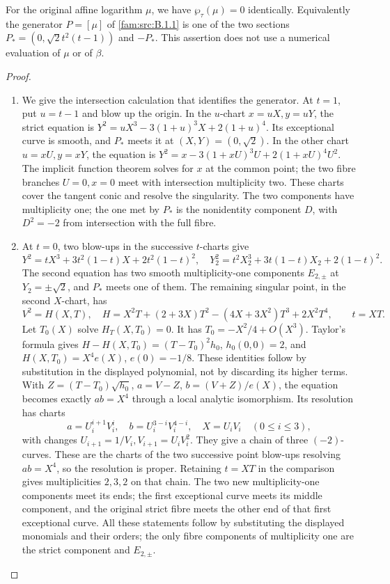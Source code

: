 \begin{proposition}\hypertarget{tag-01Q9}{}\label{fam:src:B.1.3}\label{fam:st:B.1.3}

For the original affine logarithm $\mu$, we have $\wp_\tau(\mu)=0$ identically. Equivalently the generator $P=[\mu]$ of \ref{fam:src:B.1.1} is one of the two sections $P_*=(0,\sqrt2t^2(t-1))$ and $-P_*$. This assertion does not use a numerical evaluation of $\mu$ or of $\beta$.
\end{proposition}


\begin{proof}
\begin{enumerate}[label=\arabic*.,leftmargin=*]
\item We give the intersection calculation that identifies the generator. At $t=1$, put $u=t-1$ and blow up the origin. In the $u$-chart $x=uX,y=uY$, the strict equation is
$Y^2=uX^3-3(1+u)^3X+2(1+u)^4$. Its exceptional curve is smooth, and $P_*$ meets it at $(X,Y)=(0,\sqrt2)$. In the other chart $u=xU,y=xY$, the equation is $Y^2=x-3(1+xU)^3U+2(1+xU)^4U^2$. The implicit function theorem solves for $x$ at the common point; the two fibre branches $U=0,x=0$ meet with intersection multiplicity two. These charts cover the tangent conic and resolve the singularity. The two components have multiplicity one; the one met by $P_*$ is the nonidentity component $D$, with $D^2=-2$ from intersection with the full fibre.

\item At $t=0$, two blow-ups in the successive $t$-charts give
\[
 Y^2=tX^3+3t^2(1-t)X+2t^2(1-t)^2,
\quad
 Y_2^2=t^2X_2^3+3t(1-t)X_2+2(1-t)^2.
\]
The second equation has two smooth multiplicity-one components $E_{2,\pm}$ at $Y_2=\pm\sqrt2$, and $P_*$ meets one of them. The remaining singular point, in the second $X$-chart, has
\[
 V^2=H(X,T),\quad H=X^2T+(2+3X)T^2-(4X+3X^2)T^3+2X^2T^4,
 \qquad t=XT.
\]
Let $T_0(X)$ solve $H_T(X,T_0)=0$. It has $T_0=-X^2/4+O(X^3)$. Taylor's formula gives
$H-H(X,T_0)=(T-T_0)^2h_0$, $h_0(0,0)=2$, and $H(X,T_0)=X^4e(X)$, $e(0)=-1/8$. These identities follow by substitution in the displayed polynomial, not by discarding its higher terms. With $Z=(T-T_0)\sqrt{h_0}$, $a=V-Z$, $b=(V+Z)/e(X)$, the equation becomes exactly $ab=X^4$ through a local analytic isomorphism. Its resolution has charts
\[
 a=U_i^{i+1}V_i^i,\quad b=U_i^{3-i}V_i^{4-i},\quad X=U_iV_i
 \quad(0\le i\le3),
\]
with changes $U_{i+1}=1/V_i,V_{i+1}=U_iV_i^2$. They give a chain of three $(-2)$-curves. These are the charts of the two successive point blow-ups resolving $ab=X^4$, so the resolution is proper. Retaining $t=XT$ in the comparison gives multiplicities $2,3,2$ on that chain. The two new multiplicity-one components meet its ends; the first exceptional curve meets its middle component, and the original strict fibre meets the other end of that first exceptional curve. All these statements follow by substituting the displayed monomials and their orders; the only fibre components of multiplicity one are the strict component and $E_{2,\pm}$.


\end{enumerate}
\end{proof}
